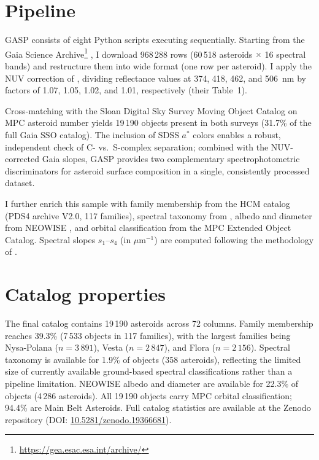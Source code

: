 \documentclass{aa}
\begin{document}
\section{Pipeline}

GASP consists of eight Python scripts executing sequentially.
Starting from the Gaia Science
Archive\footnote{\url{https://gea.esac.esa.int/archive/}}
\citep{Galluccio2023},
I download 968\,288 rows (60\,518 asteroids $\times$ 16 spectral
bands) and restructure them into wide format (one row per asteroid).
I apply the NUV correction of \citet{TinautRuano2023}, dividing
reflectance values at 374, 418, 462, and 506~nm by factors of
1.07, 1.05, 1.02, and 1.01, respectively (their Table~1).

Cross-matching with the Sloan Digital Sky Survey Moving Object
Catalog \citep[SDSS MOC4;][]{Ivezic2001} on MPC asteroid number
yields 19\,190 objects present in both surveys (31.7\% of the
full Gaia SSO catalog). The inclusion of SDSS $a^*$ colors
enables a robust, independent check of C- vs.\ S-complex
separation; combined with the NUV-corrected Gaia slopes, GASP
provides two complementary spectrophotometric discriminators for
asteroid surface composition in a single, consistently processed
dataset.

I further enrich this sample with family membership from the
\citet{Nesvorny2015} HCM catalog (PDS4 archive V2.0, 117
families), spectral taxonomy from \citet{Mahlke2022}, albedo and
diameter from NEOWISE \citep{Masiero2011}, and orbital
classification from the MPC Extended Object Catalog. Spectral
slopes $s_1$--$s_4$ (in $\mu$m$^{-1}$) are computed following
the methodology of \citet{TinautRuano2024}.

\section{Catalog properties}

The final catalog contains 19\,190 asteroids across 72 columns.
Family membership reaches 39.3\% (7\,533 objects in 117 families),
with the largest families being Nysa-Polana ($n = 3\,891$),
Vesta ($n = 2\,847$), and Flora ($n = 2\,156$). Spectral taxonomy
is available for 1.9\% of objects (358 asteroids), reflecting
the limited size of currently available ground-based spectral
classifications rather than a pipeline limitation. NEOWISE
albedo and diameter are available for 22.3\% of objects
(4\,286 asteroids). All 19\,190 objects carry MPC orbital
classification; 94.4\% are Main Belt Asteroids. Full catalog
statistics are available at the Zenodo repository
(DOI: \href{https://doi.org/10.5281/zenodo.19366681}%
{10.5281/zenodo.19366681}).
\end{document}
